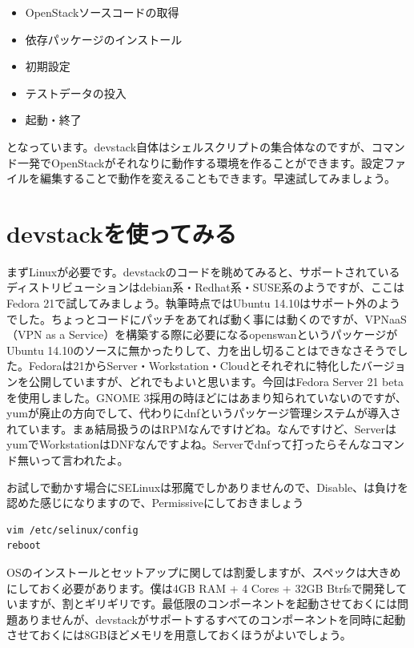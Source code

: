 \documentclass[9pt,b5paper,tombo,openany,dvipdfmx]{jsbook}
\begin{document}
\begin{itemize}
	\item OpenStackソースコードの取得
	\item 依存パッケージのインストール
	\item 初期設定
	\item テストデータの投入
	\item 起動・終了
\end{itemize}

となっています。devstack自体はシェルスクリプトの集合体なのですが、コマンド一発でOpenStackがそれなりに動作する環境を作ることができます。設定ファイルを編集することで動作を変えることもできます。早速試してみましょう。

\section{devstackを使ってみる}

まずLinuxが必要です。devstackのコードを眺めてみると、サポートされているディストリビューションはdebian系・Redhat系・SUSE系のようですが、ここはFedora 21で試してみましょう。執筆時点ではUbuntu 14.10はサポート外のようでした。ちょっとコードにパッチをあてれば動く事には動くのですが、VPNaaS（VPN as a Service）を構築する際に必要になるopenswanというパッケージがUbuntu 14.10のソースに無かったりして、力を出し切ることはできなさそうでした。Fedoraは21からServer・Workstation・Cloudとそれぞれに特化したバージョンを公開していますが、どれでもよいと思います。今回はFedora Server 21 betaを使用しました。GNOME 3採用の時ほどにはあまり知られていないのですが、yumが廃止の方向でして、代わりにdnfというパッケージ管理システムが導入されています。まぁ結局扱うのはRPMなんですけどね。なんですけど、ServerはyumでWorkstationはDNFなんですよね。Serverでdnfって打ったらそんなコマンド無いって言われたよ。

お試しで動かす場合にSELinuxは邪魔でしかありませんので、Disable、は負けを認めた感じになりますので、Permissiveにしておきましょう

\begin{lstlisting}
vim /etc/selinux/config
reboot
\end{lstlisting}

OSのインストールとセットアップに関しては割愛しますが、スペックは大きめにしておく必要があります。僕は4GB RAM + 4 Cores + 32GB Btrfsで開発していますが、割とギリギリです。最低限のコンポーネントを起動させておくには問題ありませんが、devstackがサポートするすべてのコンポーネントを同時に起動させておくには8GBほどメモリを用意しておくほうがよいでしょう。
\end{document}
